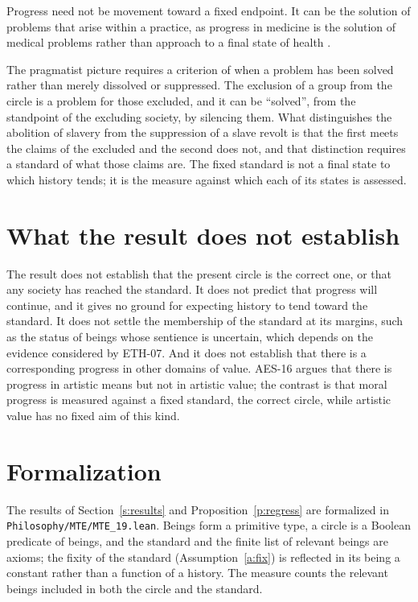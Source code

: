 \documentclass{situationist-preprint}
\begin{document}
\begin{objection}
Progress need not be movement toward a fixed endpoint. It can be the solution of problems that arise within a practice, as progress in medicine is the solution of medical problems rather than approach to a final state of health \citep{Kitcher2021}.
\end{objection}

\begin{reply}
The pragmatist picture requires a criterion of when a problem has been solved rather than merely dissolved or suppressed. The exclusion of a group from the circle is a problem for those excluded, and it can be \enquote{solved}, from the standpoint of the excluding society, by silencing them. What distinguishes the abolition of slavery from the suppression of a slave revolt is that the first meets the claims of the excluded and the second does not, and that distinction requires a standard of what those claims are. The fixed standard is not a final state to which history tends; it is the measure against which each of its states is assessed.
\end{reply}

\section{What the result does not establish}

The result does not establish that the present circle is the correct one, or that any society has reached the standard. It does not predict that progress will continue, and it gives no ground for expecting history to tend toward the standard. It does not settle the membership of the standard at its margins, such as the status of beings whose sentience is uncertain, which depends on the evidence considered by ETH-07. And it does not establish that there is a corresponding progress in other domains of value. AES-16 argues that there is progress in artistic means but not in artistic value; the contrast is that moral progress is measured against a fixed standard, the correct circle, while artistic value has no fixed aim of this kind.

\section{Formalization}

The results of Section~\ref{s:results} and Proposition~\ref{p:regress} are formalized in \nolinkurl{Philosophy/MTE/MTE_19.lean}. Beings form a primitive type, a circle is a Boolean predicate of beings, and the standard and the finite list of relevant beings are axioms; the fixity of the standard (Assumption~\ref{a:fix}) is reflected in its being a constant rather than a function of a history. The measure counts the relevant beings included in both the circle and the standard.
\end{document}
